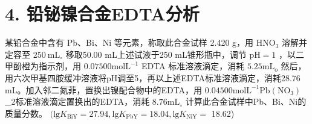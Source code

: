\section*{4. 铅铋镍合金EDTA分析}
某铅合⾦中含有 Pb、Bi、Ni 等元素，称取此合⾦试样 2.420 g，⽤ $\mathrm { H N O _ { 3 } }$ 溶解并定容⾄ $2 5 0 ~ \mathrm { m L } _ { \circ }$ 移取50.00 mL上述试液于250 mL锥形瓶中，调节 $\mathrm { p H } = 1$ ，以⼆甲酚橙为指⽰剂，⽤ $0 . 0 7 5 0 0 \mathrm { m o l } \mathrm { L } ^ { - 1 }$ EDTA 标准溶液滴定，消耗 $5 . 2 5 \mathrm { m L } _ { \mathrm { o } }$ 然后，⽤六次甲基四胺缓冲溶液将pH调⾄5，再以上述EDTA标准溶液滴定，消耗28.76 mL。加⼊邻⼆氮菲，置换出镍配合物中的EDTA，⽤ $0 . 0 4 5 0 0 \mathrm { m o l L ^ { - 1 } P b } ( \mathrm { N O _ { 3 } } )$ _{2}标准溶液滴定置换出的EDTA，消耗 $8 . 7 6 \mathrm { m L } _ { \circ }$ 计算此合⾦试样中Pb、Bi、Ni的质量分数。 $( \mathrm { l g } K _ { \mathrm { B i Y } } = 2 7 . 9 4 , \mathrm { l g } K _ { \mathrm { P b Y } } = 1 8 . 0 4 , \mathrm { l g } K _ { \mathrm { N i Y } } =$ 18.62)
